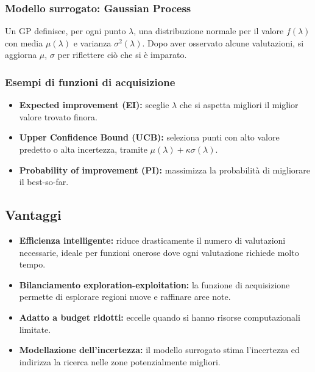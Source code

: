\documentclass[a4paper,12pt]{report}
\begin{document}
	\subsubsection{Modello surrogato: Gaussian Process}
	Un GP definisce, per ogni punto $\lambda$, una distribuzione normale per il valore $f(\lambda)$ con media $\mu(\lambda)$ e varianza $\sigma^2(\lambda)$. Dopo aver osservato alcune valutazioni, si aggiorna $\mu$, $\sigma$ per riflettere ciò che si è imparato.
	
	\subsubsection{Esempi di funzioni di acquisizione}
	\begin{itemize}
		\item \textbf{Expected improvement (EI):} sceglie $\lambda$ che si aspetta migliori il miglior valore trovato finora.
		\item \textbf{Upper Confidence Bound (UCB):} seleziona punti con alto valore predetto o alta incertezza, tramite $\mu(\lambda) + \kappa\sigma(\lambda)$.
		\item \textbf{Probability of improvement (PI):} massimizza la probabilità di migliorare il best-so-far.
	\end{itemize}
	
	\subsection{Vantaggi}
	\begin{itemize}
		\item \textbf{Efficienza intelligente:} riduce drasticamente il numero di valutazioni necessarie, ideale per funzioni onerose dove ogni valutazione richiede molto tempo.
		\item \textbf{Bilanciamento exploration-exploitation:} la funzione di acquisizione permette di esplorare regioni nuove e raffinare aree note.
		\item \textbf{Adatto a budget ridotti:} eccelle quando si hanno risorse computazionali limitate.
		\item \textbf{Modellazione dell’incertezza:} il modello surrogato stima l’incertezza ed indirizza la ricerca nelle zone potenzialmente migliori.
	\end{itemize}
	
\end{document}
